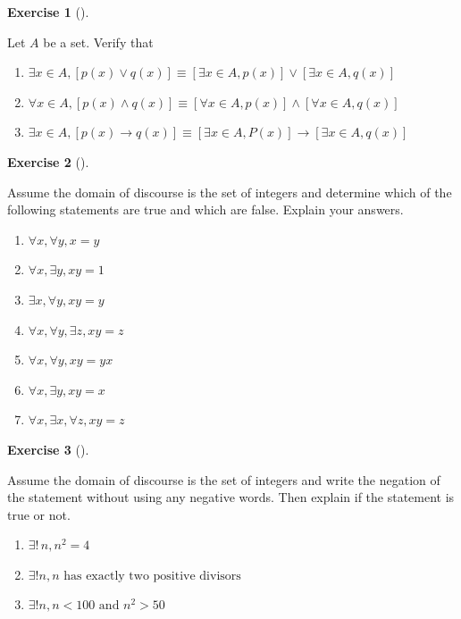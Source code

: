 \documentclass[
  letterpaper,
  10pt,
  reqno,
  twopage,
  openany]{book}
\providecommand{\tightlist}{%
  \setlength{\itemsep}{0pt}\setlength{\parskip}{0pt}}\usepackage{longtable,booktabs,array}
\theoremstyle{plain}
\theoremstyle{definition}
\newtheorem{exercise}{Exercise}[chapter]
\theoremstyle{definition}
\theoremstyle{definition}
\theoremstyle{plain}
\theoremstyle{plain}
\theoremstyle{remark}
\begin{document}
\leavevmode{}%
\begin{exercise}[]\label{exr-verify-equiv}

Let \(A\) be a set. Verify that

\begin{enumerate}
\def\labelenumi{\arabic{enumi}.}
\tightlist
\item
  \(\exists x\in A,[p(x)\lor q(x)]\equiv [\exists x\in A, p(x)]\lor [\exists x\in A, q(x)]\)
\item
  \(\forall x\in A,[p(x)\land q(x)]\equiv [\forall x\in A, p(x)]\land [\forall x\in A, q(x)]\)
\item
  \(\exists x\in A,[p(x)\rightarrow q(x)]\equiv [\exists x\in A, P(x)]\rightarrow [\exists x\in A, q(x)]\)
\end{enumerate}

\end{exercise}

\leavevmode{}%
\begin{exercise}[]\label{exr-statements-true-false}

Assume the domain of discourse is the set of integers and determine
which of the following statements are true and which are false. Explain
your answers.

\begin{enumerate}
\def\labelenumi{\arabic{enumi}.}
\tightlist
\item
  \(\forall x, \forall y, x=y\)
\item
  \(\forall x, \exists y, xy=1\)
\item
  \(\exists x, \forall y, xy=y\)
\item
  \(\forall x, \forall y, \exists z, xy=z\)
\item
  \(\forall x, \forall y, xy=yx\)
\item
  \(\forall x, \exists y , xy=x\)
\item
  \(\forall x, \exists x, \forall z, xy=z\)
\end{enumerate}

\end{exercise}

\leavevmode{}%
\begin{exercise}[]\label{exr-explian-true}

Assume the domain of discourse is the set of integers and write the
negation of the statement without using any negative words. Then explain
if the statement is true or not.

\begin{enumerate}
\def\labelenumi{\arabic{enumi}.}
\tightlist
\item
  \(\exists!\, n, n^2=4\)
\item
  \(\exists! n, n \text{ has exactly two positive divisors}\)
\item
  \(\exists ! n, n<100 \text{ and } n^2>50\)
\end{enumerate}

\end{exercise}
\end{document}

